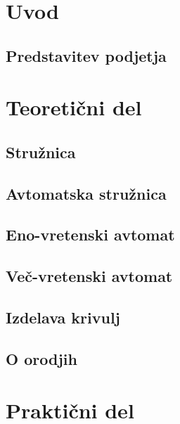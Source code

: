 \documentclass[a4paper, 12pt, fleqn]{article}
\begin{document}
\begin{sloppypar}
	\section{Uvod}
	\subsection{Predstavitev podjetja}
	
	\newpage
	
	\section{Teoretični del}
	\subsection{Stružnica}
	
	
	\subsection{Avtomatska stružnica}
	
	
	\subsection{Eno-vretenski avtomat}
	
	
	\subsection{Več-vretenski avtomat}
	
	
	\subsection{Izdelava krivulj}
	
	
	\subsection{O orodjih}
	
	
	\newpage
	\section{Praktični del}
	
	
	
	
	
	
	
	
	
	
	
\end{sloppypar}

\newpage

\renewcommand{\refname}{Viri}



\end{document}
